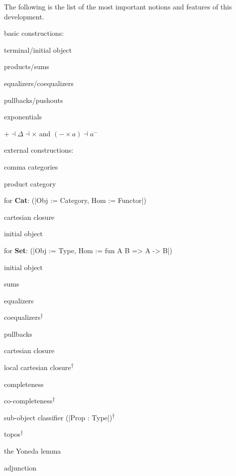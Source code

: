 \documentclass[9pt, twocolumn]{extarticle}
\renewenvironment{itemize}[1]{\begin{compactitem}#1}{\end{compactitem}}
\begin{document}
The following is the list of the most important notions and features of this development.
\begin{itemize}[\tiny$\blacksquare$]
\item basic constructions:
	\begin{itemize}
	 \item terminal/initial object
	 \item products/sums
	 \item equalizers/coequalizers
	 \item pullbacks/pushouts
	 \item exponentials
	 \item $+ \dashv \Delta \dashv \times$ and $(- \times a) \dashv a^-$
	\end{itemize}
\item external constructions:
	\begin{itemize}
	 \item comma categories
	 \item product category
	\end{itemize}
\item for \textbf{Cat}: (\Coqe|Obj := Category, Hom := Functor|)
	\begin{itemize}
	 \item cartesian closure
	 \item initial object
	\end{itemize}
\item for \textbf{Set}: (\Coqe|Obj := Type, Hom := fun A B => A -> B|)
	\begin{itemize}
	 \item initial object
	 \item sums
	 \item equalizers
	 \item coequalizers\textsuperscript{$\dagger$}
	 \item pullbacks
	 \item cartesian closure
	 \item local cartesian closure\textsuperscript{$\dagger$}
	 \item completeness
	 \item co-completeness\textsuperscript{$\dagger$}
	 \item sub-object classifier (\Coqe|Prop : Type|)\textsuperscript{$\dagger$}
	 \item topos\textsuperscript{$\dagger$}
	\end{itemize}
\item the Yoneda lemma
\item adjunction

\end{itemize}
\end{document}
